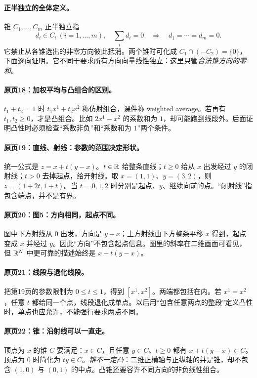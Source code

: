 \paragraph{正半独立的全体定义。}
锥 $C_1,\ldots,C_m$ 正半独立指
\[d_i\in C_i\ (i=1,\ldots,m),\quad\sum_i d_i=0
\quad\Longrightarrow\quad d_1=\cdots=d_m=0.
\]
它禁止从各锥选出的非零方向彼此抵消。两个锥时可化成 $C_1\cap(-C_2)=\{0\}$，下面逐向证明。它不同于要求所有方向向量线性独立：这里只管\emph{合法锥方向的零和}。


\paragraph{原页18：加权平均与凸组合的区别。}$t_1+t_2=1$ 时 $t_1x^1+t_2x^2$ 称仿射组合，课件称 weighted average。若再有 $t_1,t_2\ge0$，才是凸组合。比如 $2x^1-x^2$ 的系数和为 $1$，却可能跑到线段外。后面证明凸性时必须检查“系数非负”和“系数和为 $1$”两个条件。



\paragraph{原页19：直线、射线：参数的范围决定形状。}统一公式是 $z=x+t(y-x)$。$t\in\mathbb{R}$ 给整条直线；$t\ge0$ 给从 $x$ 出发经过 $y$ 的闭射线；$t>0$ 去掉起点，给开射线。取 $x=(1,1)$、$y=(3,2)$，则 $z=(1+2t,1+t)$。当 $t=0,1,2$ 时分别是起点、$y$、继续向前的点。“闭射线”指包含端点，并不是有界。



\paragraph{原页20：图5：方向相同，起点不同。}图中下方射线从 $0$ 出发，方向是 $y-x$；上方射线由下方整条平移 $x$ 得到，起点变成 $x$ 并经过 $y$。因此“方向”不包含起点信息。图里的斜率在二维画面可看见，但 $\mathbb{R}^N$ 中更可靠的描述始终是 $x+t(y-x)$。



\paragraph{原页21：线段与退化线段。}把第19页的参数限制为 $0\le t\le1$，得到 $[x^1,x^2]$。两端都包括在内。若 $x^1=x^2$，任意 $t$ 都给同一个点，线段退化成单点。以后用“包含任意两点的整段”定义凸性时，单点也应允许，不能强行要求两点不同。



\paragraph{原页22：锥：沿射线可以一直走。}顶点为 $x$ 的锥 $C$ 要满足：$x\in C$，且任意 $y\in C$、$t\ge0$ 都有 $x+t(y-x)\in C$。顶点为 $0$ 时简化为 $t y\in C$。\emph{锥不一定凸}：二维正横轴与正纵轴的并是锥，却不包含 $(1,0)$ 与 $(0,1)$ 的中点。凸锥还要容许不同方向的非负线性组合。



